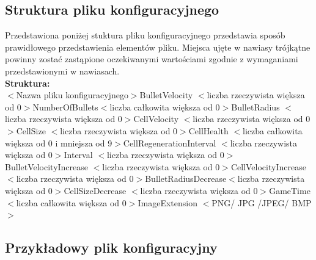 \documentclass[11pt,a4paper]{report}
\begin{document}
\subsection {Struktura pliku konfiguracyjnego}
Przedstawiona poniżej stuktura pliku konfiguracyjnego przedstawia sposób prawidłowego przedstawienia elementów pliku. Miejsca ujęte w nawiasy trójkątne powinny zostać zastąpione oczekiwanymi wartościami zgodnie z wymaganiami przedstawionymi w nawiasach.\\
\textbf{Struktura:\\}
$<$Nazwa pliku konfiguracyjnego$>$\newline
[V1] BulletVelocity $<$liczba rzeczywista większa od 0$>$\newline
[X1] NumberOfBullets$<$liczba całkowita większa od 0$>$\newline
[R1] BulletRadius $<$liczba rzeczywista większa od 0$>$\newline
[V2] CellVelocity $<$liczba rzeczywista większa od 0$>$\newline
[H1] CellSize $<$liczba rzeczywista większa od 0$>$\newline
[P1] CellHealth $<$liczba całkowita większa od 0 i mniejsza od 9$>$\newline
[T2] CellRegenerationInterval $<$liczba rzeczywista większa od 0$>$\newline
[T1] Interval $<$liczba rzeczywista większa od 0$>$\newline
[DV1] BulletVelocityIncrease $<$liczba rzeczywista większa od 0$>$\newline
[DV2] CellVelocityIncrease $<$liczba rzeczywista większa od 0$>$\newline
[DR1] BulletRadiusDecrease$<$liczba rzeczywista większa od 0$>$\newline
[DH1] CellSizeDecrease $<$liczba rzeczywista większa od 0$>$\newline
[T3] GameTime $<$liczba całkowita większa od 0$>$\newline
[IMG] ImageExtension $<$PNG/ JPG /JPEG/ BMP$>$



\subsection {Przykładowy plik konfiguracyjny}
\end{document}
